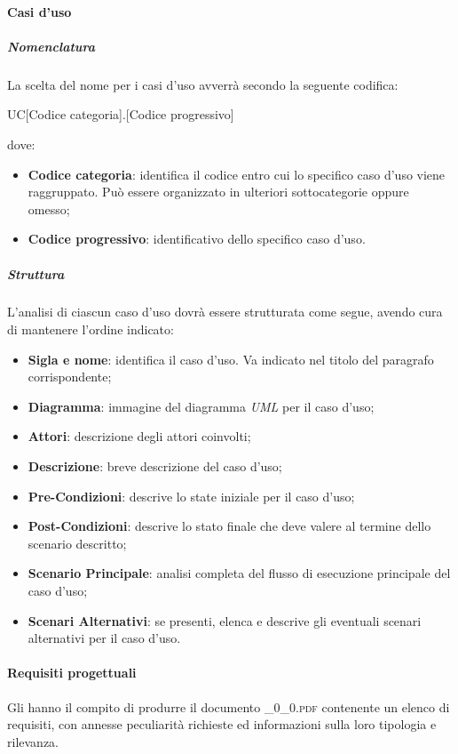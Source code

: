 		\paragraph{Casi d'uso}
		
			\subparagraph{Nomenclatura}
			La scelta del nome per i casi d'uso avverrà secondo la seguente codifica:
			\begin{center}
				UC[Codice categoria].[Codice progressivo]
			\end{center}
			dove:
			\begin{itemize}
				\item\textbf{Codice categoria}: identifica il codice entro cui lo specifico caso d'uso viene raggruppato. Può essere organizzato in ulteriori sottocategorie oppure omesso;
				\item\textbf{Codice progressivo}: identificativo dello specifico caso d'uso.
			\end{itemize}
			
			\subparagraph{Struttura}
			L'analisi di ciascun caso d'uso dovrà essere strutturata come segue, avendo cura di mantenere l'ordine indicato:
			\begin{itemize}
				\item\textbf{Sigla e nome}: identifica il caso d'uso. Va indicato nel titolo del paragrafo corrispondente;
				\item\textbf{Diagramma}: immagine del diagramma \textit{UML} per il caso d'uso;
				\item\textbf{Attori}: descrizione degli attori coinvolti;
				\item\textbf{Descrizione}: breve descrizione del caso d'uso;
				\item\textbf{Pre-Condizioni}: descrive lo state iniziale per il caso d'uso;
				\item\textbf{Post-Condizioni}: descrive lo stato finale che deve valere al termine dello scenario descritto;
				\item\textbf{Scenario Principale}: analisi completa del flusso di esecuzione principale del caso d'uso;
				\item\textbf{Scenari Alternativi}: se presenti, elenca e descrive gli eventuali scenari alternativi per il caso d'uso.
			\end{itemize}
		
		\paragraph{Requisiti progettuali}
		Gli \textit{\Anas} hanno il compito di produrre il documento \textsc{\_0\_0.pdf} contenente un elenco di requisiti, con annesse peculiarità richieste ed informazioni sulla loro tipologia e rilevanza.
		
